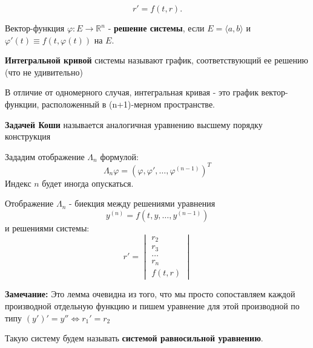 $$r' =f(t,r).$$

  Вектор-функция $\varphi: E \rightarrow \mathbb{R}^n$ -  \textbf{решение системы}, если $E  = \langle a,b \rangle$ и $\varphi'(t) \equiv f(t,\varphi(t))$ на $E$.

 \textbf{Интегральной кривой} системы называют график, соответствующий ее решению (что не удивительно)

В отличие от одномерного случая, интегральная кривая - это график вектор-функции, расположенный в (n+1)-мерном пространстве.




 \textbf{Задачей Коши} называется аналогичная уравнению высшему порядку конструкция

 Зададим отображение $\Lambda_n$ формулой:
$$\Lambda_n \varphi = (\varphi,  \varphi',\ldots , \varphi^{(n-1)})^T$$
Индекс $n$ будет иногда опускаться.


Отображение  $\Lambda_n$ - биекция между решениями уравнения 
$$y^{(n)} = f(t,y,\ldots, y^{(n-1)})$$
и решениями системы:
$$r' = \begin{vmatrix}
    r_2\\
    r_3\\
    \ldots \\
    r_n\\
    f(t,r)
\end{vmatrix}$$

\textbf{Замечание:} Это лемма очевидна из того, что мы просто сопоставляем каждой производной отдельную функцию и пишем уравнение для этой производной по типу $(y')' = y'' \Leftrightarrow r_1' = r_2$


 Такую систему будем называть \textbf{системой равносильной уравнению}.
